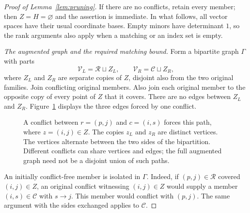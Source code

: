 \documentclass[11pt]{article}
\theoremstyle{remark}
\begin{document}
\begin{proof}[Proof of Lemma~\ref{lem:pruning}]
If there are no conflicts, retain every member; then $Z=H=\varnothing$
and the assertion is immediate.  In what follows, all vector spaces have
their usual coordinate bases.  Empty minors have determinant $1$, so the
rank arguments also apply when a matching or an index set is empty.

\medskip\noindent
\emph{The augmented graph and the required matching bound.}
Form a bipartite graph $\Gamma$ with parts
\[
 \mathcal V_L=\mathcal R\sqcup Z_L,
 \qquad
 \mathcal V_R=\mathcal C\sqcup Z_R,
\]
where $Z_L$ and $Z_R$ are separate copies of $Z$, disjoint also from the
two original families.  Join conflicting original members.  Also join
each original member to the opposite copy of every point of $Z$ that it
covers.  There are no edges between $Z_L$ and $Z_R$.
Figure~\ref{fig:pruning} displays the three edges forced by one conflict.

\begin{figure}[!ht]
 \centering

 \caption{A conflict between $r=(p,j)$ and $c=(i,s)$ forces this path,
 where $z=(i,j)\in Z$.  The copies $z_L$ and $z_R$ are distinct vertices.
 The vertices alternate between the two sides of the bipartition.
 Different conflicts can share vertices and edges; the full augmented
 graph need not be a disjoint union of such paths.}
 \label{fig:pruning}
\end{figure}

An initially conflict-free member is isolated in $\Gamma$.
Indeed, if $(p,j)\in\mathcal R$ covered $(i,j)\in Z$, an original
conflict witnessing $(i,j)\in Z$ would supply a member
$(i,s)\in\mathcal C$ with $s\to j$.  This member would conflict with
$(p,j)$.  The same argument with the sides exchanged applies to
$\mathcal C$.


\end{proof}
\end{document}
